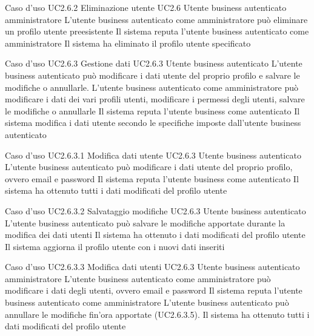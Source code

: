 \UCtitle
{Caso d'uso UC2.6.2}
{Eliminazione utente}
\UC
{UC2.6}
{Utente business autenticato amministratore}
{L'utente business autenticato come amministratore può eliminare un profilo utente preesistente}
{Il sistema reputa l'utente business autenticato come amministratore}
\post
{Il sistema ha eliminato il profilo utente specificato}

\UCtitle
{Caso d'uso UC2.6.3}
{Gestione dati}
\UC
{UC2.6.3}
{Utente business autenticato}
{L'utente business autenticato può modificare i dati utente del proprio profilo e salvare le modifiche o annullarle. L'utente business autenticato come amministratore può modificare i dati dei vari profili utenti, modificare i permessi degli utenti, salvare le modifiche o annullarle}
{Il sistema reputa l'utente business come autenticato}
\post
{Il sistema modifica i dati utente secondo le specifiche imposte dall'utente business autenticato}


\UCtitle
{Caso d'uso UC2.6.3.1}
{Modifica dati utente}
\UC
{UC2.6.3}
{Utente business autenticato}
{L'utente business autenticato può modificare i dati utente del proprio profilo, ovvero email e password}
{Il sistema reputa l'utente business come autenticato}
\post
{Il sistema ha ottenuto tutti i dati modificati del profilo utente}



\UCtitle
{Caso d'uso UC2.6.3.2}
{Salvataggio modifiche}
\UC
{UC2.6.3}
{Utente business autenticato}
{L'utente business autenticato può salvare le modifiche apportate durante la modifica dei dati utenti}
{Il sistema ha ottenuto i dati modificati del profilo utente}
\post
{Il sistema aggiorna il profilo utente con i nuovi dati inseriti}

\UCtitle
{Caso d'uso UC2.6.3.3}
{Modifica dati utenti}
\UC
{UC2.6.3}
{Utente business autenticato amministratore}
{L'utente business autenticato come amministratore può modificare i dati degli utenti, ovvero email e password}
{Il sistema reputa l'utente business autenticato come amministratore}
\estensioni
{L'utente business autenticato può annullare le modifiche fin'ora apportate (UC2.6.3.5).}
\post
{Il sistema ha ottenuto tutti i dati modificati del profilo utente}

